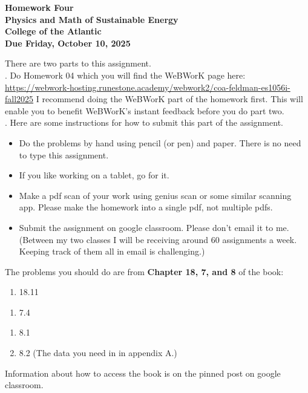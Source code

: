 \documentclass[12pt]{article}
\begin{document}
\pagestyle{empty}
 
\begin{center}
{\LARGE {\bf Homework Four}}\\
\bigskip
{\Large {\bf Physics and Math of Sustainable Energy}}\\
\bigskip
{\Large {\bf College of the Atlantic}}\\
\bigskip
{ {\bf Due Friday, October 10, 2025}}\\ 
\end{center}
\medskip


\noindent There are two parts to this assignment.\\

.  Do Homework 04 which you
will find the WeBWorK page here: \url{https://webwork-hosting.runestone.academy/webwork2/coa-feldman-es1056i-fall2025}
I recommend doing the WeBWorK part of the homework first.  This will
enable you to benefit WeBWorK's instant feedback before you do part
two.\\ 


.  Here are some
instructions for how to submit this part of the assignment.
\begin{itemize}
\item Do the problems by hand using pencil (or pen) and paper.
  There is no need to type this assignment.
\item If you like working on a tablet, go for it. 
\item Make a pdf scan of your work using genius scan or some
  similar scanning app.  Please make the homework into a single
  pdf, not multiple pdfs.
\item Submit the assignment on google classroom.  Please don't
  email it to me.  (Between my two classes I will be receiving
  around 60 assignments a week.  Keeping track of them all in email 
  is challenging.)\\
\end{itemize}

\noindent The problems you should do are from {\bf Chapter 18, 7, and
  8} of the book: \\

\begin{enumerate}
\setlength{\itemsep}{-1mm}
  \item 18.11
\end{enumerate}

\begin{enumerate}
\setlength{\itemsep}{-1mm}
\item 7.4
\end{enumerate}

\begin{enumerate}
\setlength{\itemsep}{-1mm}
\item 8.1
\item 8.2 (The data you need in in appendix A.)
\end{enumerate}

\noindent Information about how to access the book is on the
pinned post on google classroom. 
\end{document}
